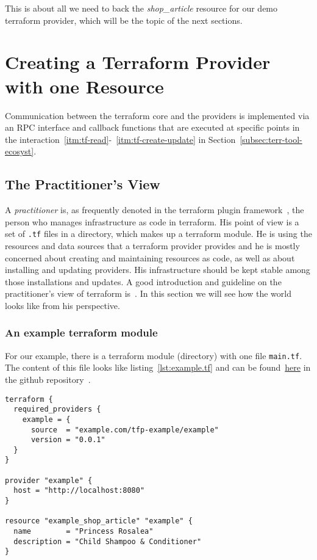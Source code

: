 \documentclass[paper=a4,11pt,numbers=noenddot]{article}
\begin{document}
This is about all we need to back the \emph{shop\_article} resource for our demo terraform provider, which will be the topic of the next sections.

\section{Creating a Terraform Provider with one Resource}
\label{sec:creat-terr-prov}

Communication between the terraform core and the providers is implemented via an RPC interface and callback functions that are executed at specific points in the interaction~\ref{itm:tf-read}-~\ref{itm:tf-create-update} in Section~\ref{subsec:terr-tool-ecosyst}.

\subsection{The Practitioner's View}
\label{subsec:practitioners-view}

A \emph{practitioner} is, as frequently denoted in the terraform plugin framework~\autocite{noauthor_terraform_framework_nodate}, the person who manages infrastructure as code in terraform. His point of view is a set of \verb'.tf' files in a directory, which makes up a terraform module. He is using the resources and data sources that a terraform provider provides and he is mostly concerned about creating and maintaining resources as code, as well as about installing and updating providers. His infrastructure should be kept stable among those installations and updates. A good introduction and guideline on the practitioner's view of terraform is~\autocite{brikman_terraform_2022}. In this section we will see how the world looks like from his perspective.

\subsubsection{An example terraform module}
\label{subsubsec:an-example-terraform}

For our example, there is a terraform module (directory) with one file \verb'main.tf'. The content of this file looks like listing~\ref{lst:example.tf} and can be found~\href{https://github.com/ecky-l/terraform-provider-example/blob/main/src/exampletf}{here} in the github repository~\autocite{ecky-l_terraform-provider-example_nodate}.

\begin{lstlisting}[label=lst:example.tf]
terraform {
  required_providers {
    example = {
      source  = "example.com/tfp-example/example"
      version = "0.0.1"
  }
}

provider "example" {
  host = "http://localhost:8080"
}

resource "example_shop_article" "example" {
  name        = "Princess Rosalea"
  description = "Child Shampoo & Conditioner"
}
\end{lstlisting}
\end{document}
